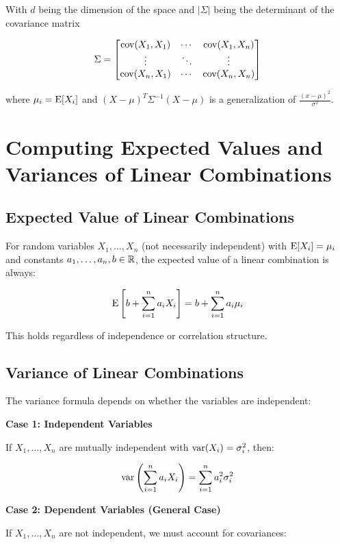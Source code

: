 With \(d\) being the dimension of the space and \(|\Sigma|\) being the determinant of the covariance matrix

\[
    \Sigma = 
    \begin{bmatrix}
        \mathrm{cov}(X_1, X_1) & \cdots & \mathrm{cov}(X_1, X_n) \\
        \vdots & \ddots & \vdots \\
        \mathrm{cov}(X_n, X_1) & \cdots & \mathrm{cov}(X_n,X_n)
    \end{bmatrix}
\]

where \(\mu_i = \mathrm{E}[X_i]\) and \((X - \mu)^T \Sigma^{-1}(X - \mu)\) is a generalization of \(\frac{(x - \mu)^2}{\sigma^2}\).

\section{Computing Expected Values and Variances of Linear Combinations}

\subsection{Expected Value of Linear Combinations}

For random variables \(X_1, \dots, X_n\) (not necessarily independent) with \(\mathrm{E}[X_i] = \mu_i\) and constants \(a_1, \dots, a_n, b \in \mathbb{R}\), the expected value of 
a linear combination is always:

\[
    \mathrm{E}\left[b + \sum_{i=1}^{n} a_i X_i\right] = b + \sum_{i=1}^{n} a_i \mu_i
\]

This holds regardless of independence or correlation structure.

\subsection{Variance of Linear Combinations}

The variance formula depends on whether the variables are independent:

\textbf{Case 1: Independent Variables}

If \(X_1, \dots, X_n\) are mutually independent with \(\mathrm{var}(X_i) = \sigma_i^2\), then:

\[
    \mathrm{var}\left(\sum_{i=1}^{n} a_i X_i\right) = \sum_{i=1}^{n} a_i^2 \sigma_i^2
\]

\textbf{Case 2: Dependent Variables (General Case)}

If \(X_1, \dots, X_n\) are not independent, we must account for covariances:

